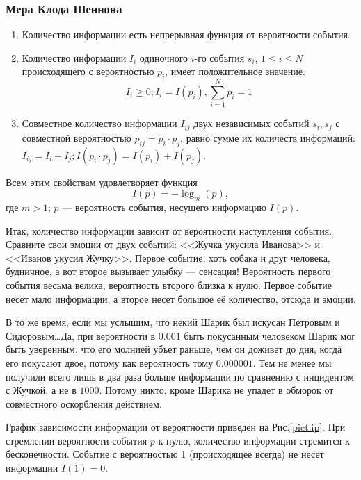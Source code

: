 \begin{frame}
    \frametitle{Мера Клода Шеннона}

    \begin{enumerate}
        \item Количество информации есть непрерывная функция от вероятности события.

        \item Количество информации $I_i$ одиночного $i$-го события $s_i$, $1\leq i\leq N$ происходящего с вероятностью $p_i$, имеет положительное значение. 
        \[I_i\geq 0; I_i=I(p_i), \sum_{i=1}^{N}p_i = 1\]

        \item Совместное количество информации $I_{ij}$ двух независимых событий $s_i, s_j$ с совместной вероятностью $p_{ij}=p_i\cdot p_j$, равно сумме их количеств информаций: 
        \(I_{ij}=I_i+I_j; I(p_i\cdot p_j)=I(p_i) + I(p_j).\)
    \end{enumerate}

    Всем этим свойствам удовлетворяет функция
    \begin{equation}
        I(p)=-\log_{m}(p),
        \label{eq:shannon}
    \end{equation}
    где $m>1$; $p$ --- вероятность события, несущего информацию $I(p)$.
\end{frame}


Итак, количество информации зависит от вероятности наступления события. Сравните свои эмоции от двух событий: <<Жучка укусила Иванова>> и <<Иванов укусил Жучку>>. Первое событие, хоть собака и друг человека, будничное, а вот второе вызывает улыбку --- сенсация! Вероятность первого события весьма велика, вероятность второго близка к нулю. Первое событие несет мало информации, а второе несет большое её количество, отсюда и эмоции.

В то же время, если мы услышим, что некий Шарик был искусан Петровым и Сидоровым\ldots Да, при вероятности в $0.001$ быть покусанным человеком Шарик мог быть уверенным, что его молнией убъет раньше, чем он доживет до дня, когда его покусают двое, потому как вероятность тому $0.000001$. Тем не менее мы получили всего лишь в два раза больше информации по сравнению с инцидентом с Жучкой, а не в $1000$. Потому никто, кроме Шарика не упадет в обморок от совместного оскорбления действием.

График зависимости информации от вероятности приведен на Рис.\ref{pict:ip}. При стремлении вероятности события $p$ к нулю, количество информации стремится к бесконечности. Событие с вероятностью 1 (происходящее всегда) не несет информации $I(1)=0$.

